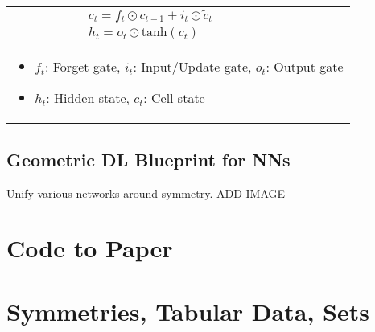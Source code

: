 \documentclass{article}
\begin{document}
\begin{summary}
\begin{center}
\begin{tabular}{llll}
            & & & $c_t = f_t \odot c_{t-1} + i_t \odot \tilde{c}_t$ \\
            & & & $h_t = o_t \odot \text{tanh}(c_t)$ \\
            \multicolumn{4}{p{\linewidth}}{
            \begin{itemize}
                \item $f_t$: Forget gate, $i_t$: Input/Update gate, $o_t$: Output gate
                \item $h_t$: Hidden state, $c_t$: Cell state
            \end{itemize}} \\
            \bottomrule
        \end{tabular}
    \end{center}
\end{summary}

\subsection{Geometric DL Blueprint for NNs}
\begin{summary}
    Unify various networks around symmetry. 
    ADD IMAGE
\end{summary}

\section{Code to Paper}


\section{Symmetries, Tabular Data, Sets}

\end{document}
